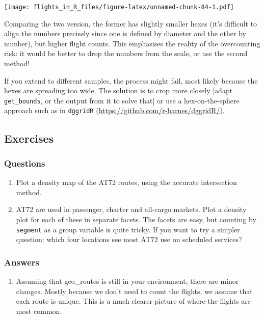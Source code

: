\documentclass[
]{book}
\providecommand{\tightlist}{%
  \setlength{\itemsep}{0pt}\setlength{\parskip}{0pt}}
\begin{document}
\texttt{[image: flights\_in\_R\_files/figure-latex/unnamed-chunk-84-1.pdf]}

Comparing the two version, the former has slightly smaller hexes (it's difficult to align the numbers precisely since one is defined by diameter and the other by number), but higher flight counts. This emphasises the reality of the overcounting risk: it would be better to drop the numbers from the scale, or use the second method!

If you extend to different samples, the process might fail, most likely because the hexes are spreading too wide. The solution is to crop more closely {[}adapt \texttt{get\_bounds}, or the output from it to solve that{]} or use a hex-on-the-sphere approach such as in \texttt{dggridR} (\url{https://github.com/r-barnes/dggridR/}).

\hypertarget{exercises-8}{%
\subsection{Exercises}\label{exercises-8}}

\hypertarget{questions-12}{%
\subsubsection{Questions}\label{questions-12}}

\begin{enumerate}
\def\labelenumi{\arabic{enumi})}
\tightlist
\item
  Plot a density map of the AT72 routes, using the accurate intersection method.
\item
  AT72 are used in passenger, charter and all-cargo markets. Plot a density plot for each of these in separate facets. The facets are easy, but counting by \texttt{segment} as a group variable is quite tricky. If you want to try a simpler question: which four locations see most AT72 use on scheduled services?
\end{enumerate}

\hypertarget{answers-12}{%
\subsubsection{Answers}\label{answers-12}}

\begin{enumerate}
\def\labelenumi{\arabic{enumi})}
\tightlist
\item
  Assuming that geo\_routes is still in your environment, there are minor changes. Mostly because we don't need to count the flights, we assume that each route is unique. This is a much clearer picture of where the flights are most common.
\end{enumerate}
\end{document}
